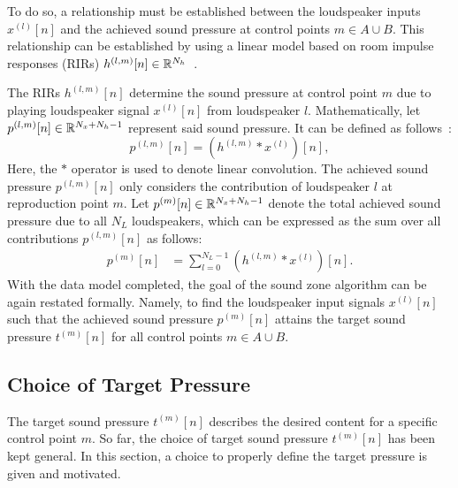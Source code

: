 To do so, a relationship must be established between the loudspeaker inputs $x^{(l)}[n]$ and the achieved sound pressure at control points $m\in A \cup B$. 
This relationship can be established by using a linear model based on room impulse responses (RIRs) $h^{(l,m)}[n]\in\mathbb{R}^{N_h}$~\cite{habets2006room}.

The RIRs $h^{(l,m)}[n]$ determine the sound pressure at control point $m$ due to playing 
loudspeaker signal $x^{(l)}[n]$ from loudspeaker $l$. 
Mathematically, let $p^{(l,m)}[n]\in\mathbb{R}^{N_x + N_h - 1}$ represent said sound pressure. 
It can be defined as follows~\cite{betlehem2015personal}:
\begin{equation}
    p^{(l,m)}[n] = \left(h^{(l,m)} \ast x^{(l)}\right)[n],
\end{equation}
Here, the $\ast$ operator is used to denote linear convolution. 
The achieved sound pressure $p^{(l,m)}[n]$ only considers the contribution of loudspeaker $l$ at reproduction point $m$.
Let $p^{(m)}[n]\in\mathbb{R}^{N_x + N_h - 1}$ denote the total achieved sound pressure due to all $N_L$ loudspeakers,
which can be expressed as the sum over all contributions $p^{(l,m)}[n]$ as follows: 
\begin{align}
    p^{(m)}[n] &= \sum_{l=0}^{N_L - 1} \left(h^{(l,m)} \ast x^{(l)}\right)[n].
    \label{eq:sound_zone:data_model:achieved_pressure}
\end{align}
With the data model completed, the goal of the sound zone algorithm can be again restated formally.
Namely, to find the loudspeaker input signals $x^{(l)}[n]$ such that the achieved sound pressure $p^{(m)}[n]$ attains the
target sound pressure $t^{(m)}[n]$ for all control points $m\in A \cup B$.

\subsection{Choice of Target Pressure}
\label{ch:sound_zone:data_model:target_pressure_choice}
The target sound pressure $t^{(m)}[n]$ describes the desired content for a specific control point $m$. 
So far, the choice of target sound pressure $t^{(m)}[n]$ has been kept general. 
In this section, a choice to properly define the target pressure is given and motivated.

